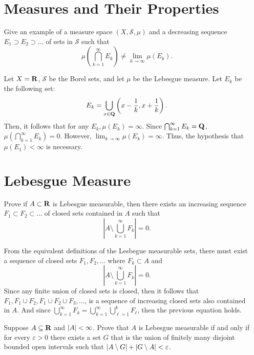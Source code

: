 \documentclass[11pt,oneside]{book}
\begin{document}
\section{Measures and Their Properties}

\begin{exercise}
    Give an example of a measure space $(X, \mathscr{S}, \mu)$ and a decreasing sequence $E_1 \supset E_2 \supset \ldots$ of sets in $\mathscr{S}$ such that \[
    \mu\left(\bigcap_{k=1}^\infty E_k\right) \neq \lim_{k\to\infty} \mu(E_k).
    \]
\end{exercise}
\begin{solution}
    Let $X = \mathbf{R}$, $\mathscr{S}$ be the Borel sets, and let $\mu$ 
    be the Lebesgue measure. Let $E_k$ be the following set:
    \[
        E_k = \bigcup_{x \in \mathbf{Q}} \left(x-\frac{1}{k}, x + \frac{1}{k}\right).
    \]
    Then, it follows that for any $E_k, \mu(E_k) = \infty$. Since $\bigcap_{k=1}^\infty E_k = \mathbf{Q}$, 
    $\mu\left(\bigcap_{k=1}^\infty E_k\right) = 0$. However, $\lim_{k\to\infty} \mu(E_k) = \infty$. 
    Thus, the hypothesis that $\mu(E_1) < \infty$ is necessary.
\end{solution}

\section{Lebesgue Measure}
\begin{exercise}
    Prove if $A \subset \mathbf{R}$ is Lebesgue measurable, then there exists an increasing sequence $F_1 \subset F_2 \subset \ldots$ of closed sets contained in $A$ such that \[
    \left|A \setminus \bigcup_{k=1}^\infty F_k\right| = 0.
    \]
\end{exercise}
\begin{solution}
    From the equivalent definitions of the Lesbegue measurable sets,
    there must exist a sequence of closed sets $F_1, F_2, \ldots$ where $F_k
    \subset A$ and 
    \[
        \left|A \setminus \bigcup_{k=1}^{\infty} F_k\right| = 0.
    \]
    Since any finite union of closed sets is closed, then it follows that $F_1,
    F_1 \cup F_2, F_1 \cup F_2 \cup F_3, \ldots$, is a sequence of increasing
    closed sets also contained in $A$. And since $\bigcup_{k=1}^\infty F_k =
    \bigcup_{k=1}^\infty \bigcup_{\ell=1}^k F_\ell$, then the previous equation
    holds.
\end{solution}

\begin{exercise}
    Suppose $A \subseteq \mathbf{R}$ and $\lvert A\rvert < \infty$. Prove that $A$ is Lebesgue measurable if and only if for every $\varepsilon > 0$ there exists a set $G$ that is the union of finitely many disjoint bounded open intervals such that $\lvert A \setminus G\rvert + \lvert G \setminus A\rvert < \varepsilon$.
\end{exercise}
\end{document}
